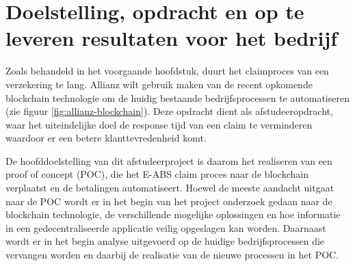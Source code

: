 \chapter{Doelstelling, opdracht en op te leveren resultaten voor het bedrijf}
Zoals behandeld in het voorgaande hoofdstuk, duurt het claimproces van een verzekering te lang. Allianz wilt gebruik maken van de recent opkomende blockchain technologie om de huidig bestaande bedrijfsprocessen te automatiseren (zie figuur \ref{fig:allianz-blockchain}). Deze opdracht dient als afstudeeropdracht, waar het uiteindelijke doel de response tijd van een claim te verminderen waardoor er een betere klanttevredenheid komt.\par

De hoofddoelstelling van dit afstudeerproject is daarom het realiseren van een proof of concept (POC), die het E-ABS claim proces naar de blockchain verplaatst en de betalingen automatiseert. Hoewel de meeste aandacht uitgaat naar de POC wordt er in het begin van het project onderzoek gedaan naar de blockchain technologie, de verschillende mogelijke oplossingen en hoe informatie in een gedecentraliseerde applicatie veilig opgeslagen kan worden. Daarnaast wordt er in het begin analyse uitgevoerd op de huidige bedrijfsprocessen die vervangen worden en daarbij de realisatie van de nieuwe processen in het POC.

